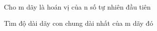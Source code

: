Cho m dãy là hoán vị của n số tự nhiên đầu tiên  

   Tìm độ dài dãy con chung dài nhất của m dãy đó  

\